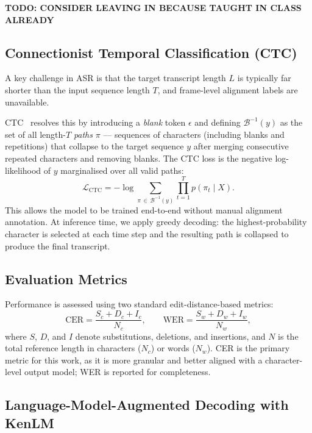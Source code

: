 \documentclass{article}
\begin{document}
\textbf{TODO: CONSIDER LEAVING IN BECAUSE TAUGHT IN CLASS ALREADY}
\subsection{Connectionist Temporal Classification (CTC)}

A key challenge in ASR is that the target transcript length $L$ is typically far shorter than the input sequence length $T$, and frame-level alignment labels are unavailable.

CTC~\cite{graves2006connectionist} resolves this by introducing a \textit{blank} token $\epsilon$ and defining $\mathcal{B}^{-1}(y)$ as the set of all length-$T$ \textit{paths} $\pi$ — sequences of characters (including blanks and repetitions) that collapse to the target sequence $y$ after merging consecutive repeated characters and removing blanks. The CTC loss is the negative log-likelihood of $y$ marginalised over all valid paths:
\begin{equation}
    \mathcal{L}_\text{CTC} = -\log \sum_{\pi \,\in\, \mathcal{B}^{-1}(y)} \prod_{t=1}^{T} p(\pi_t \mid X).
    \label{eq:ctc}
\end{equation}
This allows the model to be trained end-to-end without manual alignment annotation. At inference time, we apply greedy decoding: the highest-probability character is selected at each time step and the resulting path is collapsed to produce the final transcript.

\subsection{Evaluation Metrics}

Performance is assessed using two standard edit-distance-based metrics:
\begin{equation}
    \text{CER} = \frac{S_c + D_c + I_c}{N_c}, \qquad \text{WER} = \frac{S_w + D_w + I_w}{N_w},
\end{equation}
where $S$, $D$, and $I$ denote substitutions, deletions, and insertions, and $N$ is the total reference length in characters ($N_c$) or words ($N_w$). CER is the primary metric for this work, as it is more granular and better aligned with a character-level output model; WER is reported for completeness.

\subsection{Language-Model-Augmented Decoding with KenLM}
\end{document}
